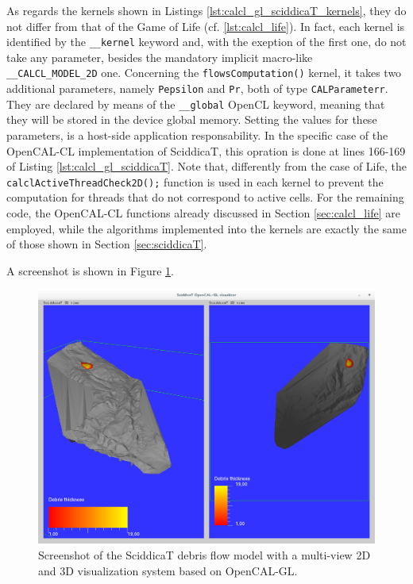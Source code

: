 As regards the kernels shown in Listings
\ref{lst:calcl_gl_sciddicaT_kernels}, they do not differ from that of
the Game of Life (cf. \ref{lst:calcl_life}). In fact, each kernel is
identified by the \verb'__kernel' keyword and, with the exeption of
the first one, do not take any parameter, besides the mandatory
implicit macro-like \verb'__CALCL_MODEL_2D' one. Concerning the
\verb'flowsComputation()' kernel, it takes two additional parameters,
namely \verb'Pepsilon' and \verb'Pr', both of type
\verb'CALParameterr'. They are declared by means of the
\verb'__global' OpenCL keyword, meaning that they will be stored in
the device global memory. Setting the values for these parameters, is
a host-side application responsability. In the specific case of the
OpenCAL-CL implementation of SciddicaT, this opration is done at lines
166-169 of Listing \ref{lst:calcl_gl_sciddicaT}. Note that,
differently from the case of Life, the
\verb'calclActiveThreadCheck2D();' function is used in each kernel to
prevent the computation for threads that do not correspond to active
cells. For the remaining code, the OpenCAL-CL functions already
discussed in Section \ref{sec:calcl_life} are employed, while
the algorithms implemented into the kernels are exactly the same of
those shown in Section \ref{sec:sciddicaT}.

A screenshot is shown in Figure \ref{fig:calgl_sciddicaT2}.

\begin{figure}
  \begin{center}
    \includegraphics[width=12cm]{./images/OpenCAL/calgl_sciddicaT1}
    \caption{Screenshot of the SciddicaT debris flow model with a
      multi-view 2D and 3D visualization system based on OpenCAL-GL.}
    \label{fig:calgl_sciddicaT2}
  \end{center}
\end{figure}


